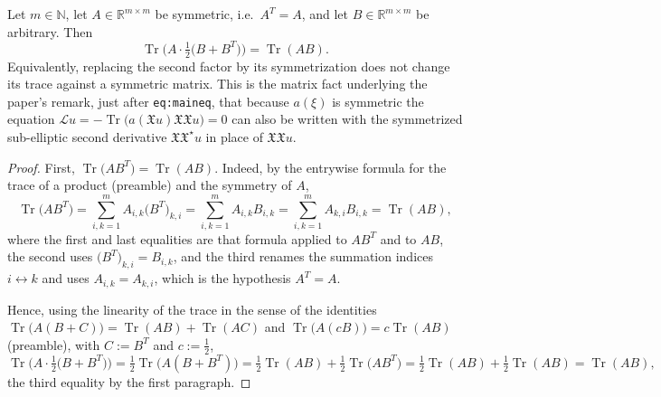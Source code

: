 \begin{lemma}
Let $m\in\mathbb{N}$, let $A\in\mathbb{R}^{m\times m}$ be symmetric, i.e.\ $A^T=A$, and let
$B\in\mathbb{R}^{m\times m}$ be arbitrary. Then
$$\operatorname{Tr}\Big(A\cdot\tfrac12\big(B+B^T\big)\Big)=\operatorname{Tr}(AB).$$
Equivalently, replacing the second factor by its symmetrization does not change its trace against
a symmetric matrix. This is the matrix fact underlying the paper's remark, just after
\texttt{eq:maineq}, that because $a(\xi)$ is symmetric the equation
$\mathcal{L}u=-\operatorname{Tr}\big(a(\mathfrak{X}u)\mathfrak{X}\mathfrak{X}u\big)=0$ can also be
written with the symmetrized sub-elliptic second derivative
$\mathfrak{X}\mathfrak{X}^\star u$ in place of $\mathfrak{X}\mathfrak{X}u$.
\end{lemma}
\begin{proof}
First, $\operatorname{Tr}\big(AB^T\big)=\operatorname{Tr}(AB)$. Indeed, by the entrywise formula
for the trace of a product (preamble) and the symmetry of $A$,
$$\operatorname{Tr}\big(AB^T\big)=\sum_{i,k=1}^mA_{i,k}\big(B^T\big)_{k,i}
=\sum_{i,k=1}^mA_{i,k}B_{i,k}
=\sum_{i,k=1}^mA_{k,i}B_{i,k}=\operatorname{Tr}(AB),$$
where the first and last equalities are that formula applied to $AB^T$ and to $AB$, the second
uses $\big(B^T\big)_{k,i}=B_{i,k}$, and the third renames the summation indices
$i\leftrightarrow k$ and uses $A_{i,k}=A_{k,i}$, which is the hypothesis $A^T=A$.

Hence, using the linearity of the trace in the sense of the identities
$\operatorname{Tr}\big(A(B+C)\big)=\operatorname{Tr}(AB)+\operatorname{Tr}(AC)$ and
$\operatorname{Tr}\big(A(cB)\big)=c\operatorname{Tr}(AB)$ (preamble), with $C:=B^T$ and
$c:=\tfrac12$,
$$\operatorname{Tr}\Big(A\cdot\tfrac12\big(B+B^T\big)\Big)
=\tfrac12\operatorname{Tr}\big(A(B+B^T)\big)
=\tfrac12\operatorname{Tr}(AB)+\tfrac12\operatorname{Tr}\big(AB^T\big)
=\tfrac12\operatorname{Tr}(AB)+\tfrac12\operatorname{Tr}(AB)=\operatorname{Tr}(AB),$$
the third equality by the first paragraph.
\end{proof}
